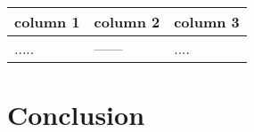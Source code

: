 \documentclass[12pt,a4paper]{report}
\begin{document}
\begin{center}
    \begin{tabular}{ | p{4.8cm} | p{4.8cm} | p{4.8cm} |}
    \hline
       \textbf{column 1}
         & \textbf{column 2}
         & \textbf{column 3}\\ \hline \hline
       .....
         & ------
         & .... \\ \hline
     \end{tabular}
\end{center}

\chapter{Conclusion}


\begin{appendices}



\end{appendices}



\end{document}

